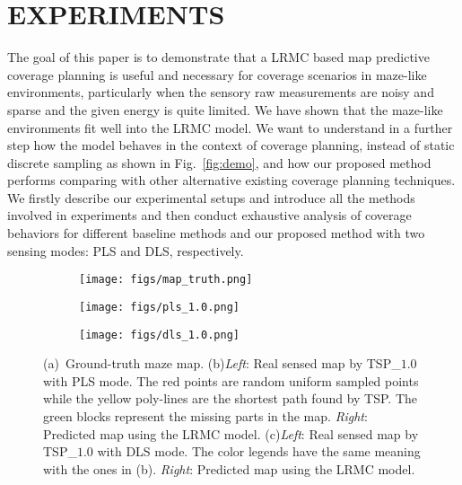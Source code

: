 \section{EXPERIMENTS}
The goal of this paper is to demonstrate that a LRMC based map predictive coverage planning is useful and necessary for coverage scenarios in maze-like environments, particularly when the sensory raw measurements are noisy and sparse and the given energy is quite limited. We have shown that the maze-like environments fit well into the LRMC model. We want to understand in a further step how the model behaves in the context of coverage planning, instead of static discrete sampling as shown in Fig.~\ref{fig:demo}, and how our proposed method performs comparing with other alternative existing coverage planning techniques. We firstly describe our experimental setups and introduce all the methods involved in experiments and then conduct exhaustive analysis of coverage behaviors for different baseline methods and our proposed method with two sensing modes: PLS and DLS, respectively.

\begin{figure*}%
  \centering
  \begin{subfigure}[b]{0.19\linewidth}
    \texttt{[image: figs/map\_truth.png]}
    \caption{}
  \end{subfigure}
  \begin{subfigure}[b]{0.39\linewidth}
    \texttt{[image: figs/pls\_1.0.png]}
    \caption{}
  \end{subfigure}
  \begin{subfigure}[b]{0.39\linewidth}
    \texttt{[image: figs/dls\_1.0.png]}
    \caption{}
  \end{subfigure}
  \caption{\small (a)~Ground-truth maze map. (b)\textit{Left}: Real sensed map by TSP\_$1.0$ with PLS mode. The red points are random uniform sampled points while the yellow poly-lines are the shortest path found by TSP. The green blocks represent the missing parts in the map. \textit{Right}: Predicted map using the LRMC model. (c)\textit{Left}: Real sensed map by TSP\_$1.0$ with DLS mode. The color legends have the same meaning with the ones in (b). \textit{Right}: Predicted map using the LRMC model.}
  \label{fig:tsp_results}
\end{figure*}

